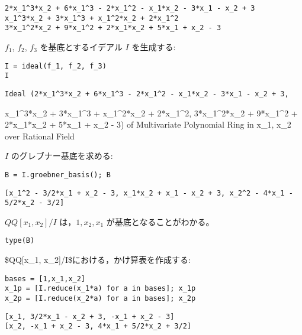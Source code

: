 \documentclass[dvipdfmx,11pat]{jarticle}
\begin{document}
\label{orgb70e1fb}
\begin{verbatim}
2*x_1^3*x_2 + 6*x_1^3 - 2*x_1^2 - x_1*x_2 - 3*x_1 - x_2 + 3
x_1^3*x_2 + 3*x_1^3 + x_1^2*x_2 + 2*x_1^2
3*x_1^2*x_2 + 9*x_1^2 + 2*x_1*x_2 + 5*x_1 + x_2 - 3
\end{verbatim}




\(f_1\), \(f_2\), \(f_3\) を基底とするイデアル \(I\) を生成する:

\begin{verbatim}
I = ideal(f_1, f_2, f_3)
I
\end{verbatim}

\label{org89f8953}
\begin{verbatim}
Ideal (2*x_1^3*x_2 + 6*x_1^3 - 2*x_1^2 - x_1*x_2 - 3*x_1 - x_2 + 3,
\end{verbatim}

x\_1\^{}3*x\_2 + 3*x\_1\^{}3 + x\_1\^{}2*x\_2 + 2*x\_1\^{}2,
3*x\_1\^{}2*x\_2 + 9*x\_1\^{}2 + 2*x\_1*x\_2 + 5*x\_1 + x\_2 - 3)
of Multivariate Polynomial Ring in x\_1, x\_2 over Rational Field

\(I\)  のグレブナー基底を求める:

\begin{verbatim}
B = I.groebner_basis(); B
\end{verbatim}

\label{orge3872c1}
\begin{verbatim}
[x_1^2 - 3/2*x_1 + x_2 - 3, x_1*x_2 + x_1 - x_2 + 3, x_2^2 - 4*x_1 - 5/2*x_2 - 3/2]
\end{verbatim}


\(QQ[x_1, x_2]/I\) は，\(1, x_2, x_1\) が基底となることがわかる。

\begin{verbatim}
type(B)
\end{verbatim}

\$QQ[x\_1, x\_2]/I\$における，かけ算表を作成する:

\begin{verbatim}
bases = [1,x_1,x_2]
x_1p = [I.reduce(x_1*a) for a in bases]; x_1p
x_2p = [I.reduce(x_2*a) for a in bases]; x_2p

\end{verbatim}

\label{org95b0277}
\begin{verbatim}
[x_1, 3/2*x_1 - x_2 + 3, -x_1 + x_2 - 3]
[x_2, -x_1 + x_2 - 3, 4*x_1 + 5/2*x_2 + 3/2]
\end{verbatim}
\end{document}
